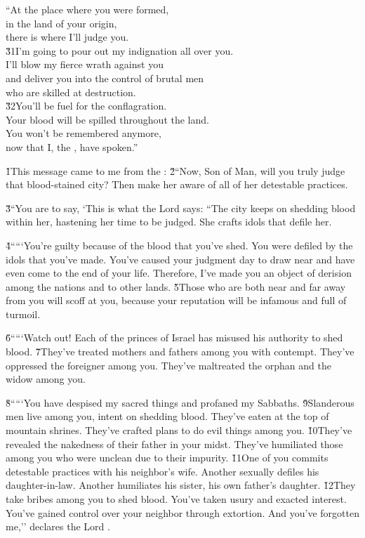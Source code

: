 \begin{poetry}
\poeml ``At the place where you were formed, \\
\poemll    in the land of your origin, \\
\poemlll       there is where I'll judge you. \\
\poeml \v{31}I'm going to pour out my indignation all over you. \\
\poemll    I'll blow my fierce wrath against you \\
\poeml and deliver you into the control of brutal men \\
\poemll    who are skilled at destruction. \\
\poeml \v{32}You'll be fuel for the conflagration. \\
\poemll    Your blood will be spilled throughout the land. \\
\poeml You won't be remembered anymore, \\
\poemll    now that I, the , have spoken.''
\end{poetry}

\v{1}This message came to me from the : \v{2}``Now, Son of Man, will you truly judge that blood-stained city? Then make her aware of all of her detestable practices.

\v{3}``You are to say, `This is what the Lord  says: ``The city keeps on shedding blood within her, hastening her time to be judged. She crafts idols that defile her.

\v{4}`````You're guilty because of the blood that you've shed. You were defiled by the idols that you've made. You've caused your judgment day to draw near and have even come to the end of your life. Therefore, I've made you an object of derision among the nations and to other lands. \v{5}Those who are both near and far away from you will scoff at you, because your reputation will be infamous and full of turmoil.

\v{6}`````Watch out! Each of the princes of Israel has misused his authority to shed blood. \v{7}They've treated mothers and fathers among you with contempt. They've oppressed the foreigner among you. They've maltreated the orphan and the widow among you.

\v{8}`````You have despised my sacred things and profaned my Sabbaths. \v{9}Slanderous men live among you, intent on shedding blood. They've eaten at the top of mountain shrines. They've crafted plans to do evil things among you. \v{10}They've revealed the nakedness of their father in your midst. They've humiliated those among you who were unclean due to their impurity. \v{11}One of you commits detestable practices with his neighbor's wife. Another sexually defiles his daughter-in-law. Another humiliates his sister, his own father's daughter. \v{12}They take bribes among you to shed blood. You've taken usury and exacted interest. You've gained control over your neighbor through extortion. And you've forgotten me,'' declares the Lord .

